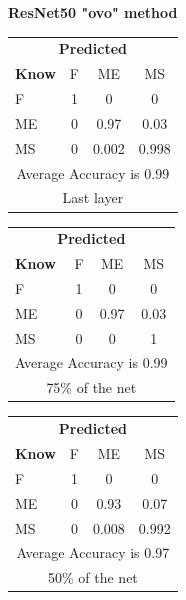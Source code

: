\documentclass[12pt]{article} %
\begin{document}
\begin{center}
\textbf{ ResNet50 "ovo" method}
\end{center}
\begin{minipage}{0.5\textwidth}
\begin{center}
\begin{tabular}{l|c|c|c|}
 \multicolumn{4}{c}{ \textbf{ Predicted}}\\
 \textbf{Know}&F&ME&MS\\ \hline\hline
F   &1&0&0\\
ME &0&0.97&0.03\\
MS &0&0.002&0.998\\
\multicolumn{4}{c}{Average Accuracy is 0.99}\\
\multicolumn{4}{c}{Last layer}\\
\end{tabular}
\end{center}
\end{minipage}
\begin{minipage}{0.5\textwidth}
\begin{center}
\begin{tabular}{l|c|c|c|}
 \multicolumn{4}{c}{ \textbf{ Predicted}}\\
 \textbf{Know}&F&ME&MS\\ \hline\hline
F    &1&0&0\\
ME &0&0.97&0.03\\
MS &0&0&1\\
\multicolumn{4}{c}{Average Accuracy is 0.99}\\
\multicolumn{4}{c}{75\%  of the net}\\
\end{tabular}
\end{center}
\end{minipage}
\begin{minipage}{0.5\textwidth}
\begin{center}
\begin{tabular}{l|c|c|c|}
 \multicolumn{4}{c}{ \textbf{ Predicted}}\\
 \textbf{Know}&F&ME&MS\\ \hline\hline
F   &1&0&0\\
ME &0&0.93&0.07\\
MS &0&0.008&0.992\\
\multicolumn{4}{c}{Average Accuracy is 0.97}\\
\multicolumn{4}{c}{50\%  of the net}\\
\end{tabular}
\end{center}
\end{minipage}
\end{document}
